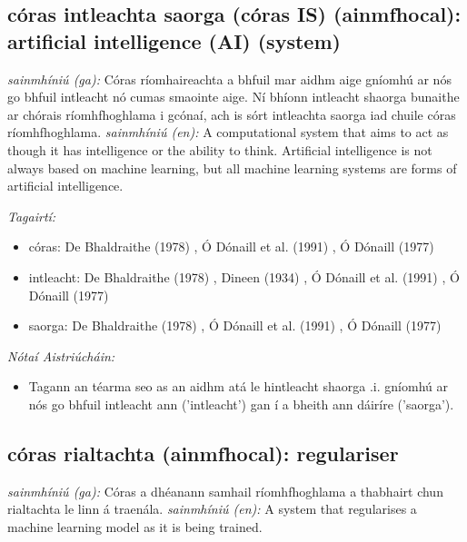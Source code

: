 \documentclass{article}
\begin{document}
\subsection*{córas intleachta saorga (córas IS) (ainmfhocal): artificial intelligence (AI) (system)} 
 \noindent \textit{sainmhíniú (ga):} Córas ríomhaireachta a bhfuil mar aidhm aige gníomhú ar nós go bhfuil intleacht nó cumas smaointe aige. Ní bhíonn intleacht shaorga bunaithe ar chórais ríomhfhoghlama i gcónaí, ach is sórt intleachta saorga iad chuile córas ríomhfhoghlama.
\newline\newline
 \noindent \textit{sainmhíniú (en):} A computational system that aims to act as though it has intelligence or the ability to think. Artificial intelligence is not always based on machine learning, but all machine learning systems are forms of artificial intelligence.
\newline

 \noindent \textit{Tagairtí:}
\begin{itemize}
	\item córas: De Bhaldraithe (1978) \cite{de-bhaldraithe}, Ó Dónaill et al. (1991) \cite{focloir-beag}, Ó Dónaill (1977) \cite{odonaill}
	\item intleacht: De Bhaldraithe (1978) \cite{de-bhaldraithe}, Dineen (1934) \cite{dineen}, Ó Dónaill et al. (1991) \cite{focloir-beag}, Ó Dónaill (1977) \cite{odonaill}
	\item saorga: De Bhaldraithe (1978) \cite{de-bhaldraithe}, Ó Dónaill et al. (1991) \cite{focloir-beag}, Ó Dónaill (1977) \cite{odonaill}
\end{itemize}

 \noindent \textit{Nótaí Aistriúcháin:}
\begin{itemize}
	\item Tagann an téarma seo as an aidhm atá le hintleacht shaorga .i. gníomhú ar nós go bhfuil intleacht ann ('intleacht') gan í a bheith ann dáiríre ('saorga').
\end{itemize}


\subsection*{córas rialtachta (ainmfhocal): regulariser} 
 \noindent \textit{sainmhíniú (ga):} Córas a dhéanann samhail ríomhfhoghlama a thabhairt chun rialtachta le linn á traenála.
\newline\newline
 \noindent \textit{sainmhíniú (en):} A system that regularises a machine learning model as it is being trained.
\newline
\end{document}
